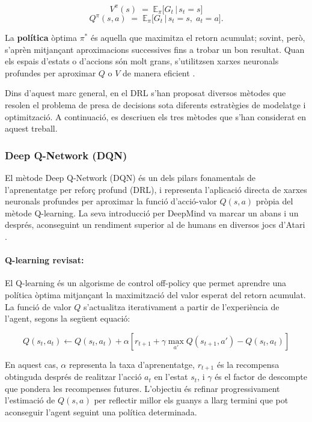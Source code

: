 \documentclass[12pt,a4paper,twoside]{book}
\begin{document}
\begin{equation}
V^\pi(s) \;=\; \mathbb{E}_\pi\bigl[G_t \,\big\vert\, s_t = s\bigr]
\end{equation}
\begin{equation}
Q^\pi(s,a) \;=\; \mathbb{E}_\pi\bigl[G_t \,\big\vert\, s_t = s,\; a_t = a\bigr].
\end{equation}

La \textbf{política} òptima $\pi^*$ és aquella que maximitza el retorn acumulat; sovint, però, s'aprèn mitjançant aproximacions successives fins a trobar un bon resultat. Quan els espais d'estats o d'accions són molt grans, s'utilitzsen xarxes neuronals profundes per aproximar $Q$ o $V$ de manera eficient \cite{RLIntro}.

\vspace{2ex}
Dins d'aquest marc general, en el DRL s'han proposat diversos mètodes que resolen el problema de presa de decisions sota diferents estratègies de modelatge i optimització. A continuació, es descriuen els tres mètodes que s'han considerat en aquest treball.

\subsubsection{Deep Q-Network (DQN)}

El mètode Deep Q-Network (DQN) és un dels pilars fonamentals de l'aprenentatge per reforç profund (DRL), i representa l'aplicació directa de xarxes neuronals profundes per aproximar la funció d'acció-valor $Q(s, a)$ pròpia del mètode Q-learning. La seva introducció per DeepMind \cite{MnihNature2015} va marcar un abans i un després, aconseguint un rendiment superior al de humans en diversos jocs d'Atari \cite{M9}.

\paragraph{Q-learning revisat:}
El Q-learning és un algorisme de control off-policy que permet aprendre una política òptima mitjançant la maximització del valor esperat del retorn acumulat. La funció de valor $Q$ s'actualitza iterativament a partir de l'experiència de l'agent, segons la següent equació:

\begin{equation}
Q(s_t, a_t) \leftarrow Q(s_t, a_t) + \alpha \left[ r_{t+1} + \gamma \max_{a'} Q(s_{t+1}, a') - Q(s_t, a_t) \right]
\end{equation}

En aquest cas, $\alpha$ representa la taxa d'aprenentatge, $r_{t+1}$ és la recompensa obtinguda després de realitzar l'acció $a_t$ en l'estat $s_t$, i $\gamma$ és el factor de descompte que pondera les recompenses futures. L'objectiu és refinar progressivament l'estimació de $Q(s,a)$ per reflectir millor els guanys a llarg termini que pot aconseguir l'agent seguint una política determinada.
\end{document}
